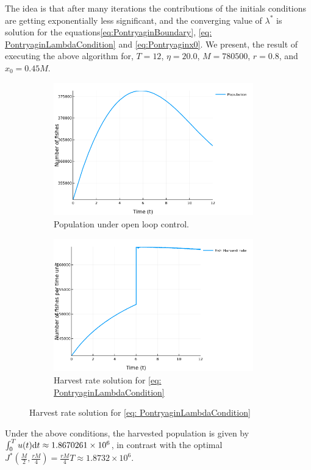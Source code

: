 The idea is that after many iterations the contributions of the initials conditions are getting exponentially less significant, and the converging value of $\lambda^*$ is solution for the equations\ref{eq:PontryaginBoundary}, \ref{eq: PontryaginLambdaCondition} and \ref{eq:Pontryaginx0}.
We present, the result of executing the above algorithm for,
$T=12$, $\eta=20.0$, $M=780500$, $r=0.8$, and $x_0=0.45M$.
\begin{figure}[H]
	\caption{Smooth Control for Open Loop Strategy.}
	\begin{subfigure}{0.48\textwidth}
		\includegraphics[width=0.95\textwidth]{Population.png}
		\caption{Population under open loop control.}
	\end{subfigure}
	\begin{subfigure}{0.48\textwidth}
		\includegraphics[width=0.95\textwidth]{Harvest}
		\caption{Harvest rate solution for \ref{eq: PontryaginLambdaCondition} }
	\end{subfigure}
\end{figure}
Under the above conditions, the harvested population is given by $\int_{0}^{T} u(t) \mathrm{d} t \approx 1.8670261\times 10^6$, in contrast with the optimal $J^*(\frac{M}{2}, \frac{rM}{4})=\frac{rM}{4}T\approx1.8732\times 10^6$.
